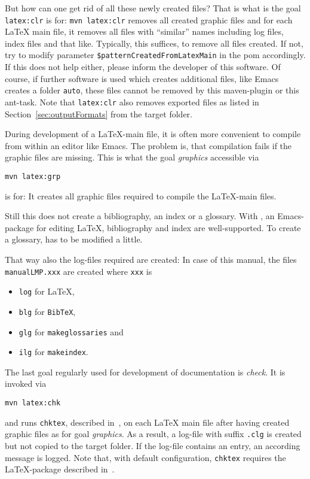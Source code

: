 But how can one get rid of all these newly created files? 
That is what is the goal \texttt{latex:clr} is for: 
% 
\texttt{mvn latex:clr}
%
removes all created graphic files 
and for each \LaTeX{} main file, it removes all files with ``similar'' names
including log files, index files and that like.
Typically, this suffices, to remove all files created. 
If not, 
try to modify parameter \texttt{\$patternCreatedFromLatexMain} 
in the pom accordingly. 
If this does not help either, please inform the developer of this software. 
Of course, if further software is used which creates additional files, 
like Emacs creates a folder \texttt{auto}, 
these files cannot be removed by this maven-plugin or this ant-task.
Note that \texttt{latex:clr}
also removes exported files as listed in Section~\ref{sec:outputFormats}
from the target folder. 

During development of a \LaTeX-main file, 
it is often more convenient to compile from within an editor like Emacs. 
The problem is, that compilation fails if the graphic files are missing. 
This is what the goal \emph{graphics} accessible via 
% 
\begin{Verbatim}
mvn latex:grp
\end{Verbatim}
%
is for: 
It creates all graphic files required to compile the \LaTeX-main files. 

Still this does not create a bibliography, an index or a glossary. 
With \auctex{}, an Emacs-package for editing \LaTeX, 
bibliography and index are well-supported. 
To create a glossary, \auctex{} has to be modified a little. 


That way also the log-files required are created: 
In case of this manual, 
the files \texttt{manualLMP.xxx} are created 
where \texttt{xxx} is 
%
\begin{itemize}
\item
\texttt{log} for \LaTeX, 
\item
\texttt{blg} for \texttt{BibTeX}, 
\item
\texttt{glg} for \texttt{makeglossaries} and 
\item
\texttt{ilg} for \texttt{makeindex}. 
\end{itemize}

The last goal regularly used for development of documentation is \emph{check}. 
It is invoked via 
% 
\begin{Verbatim}
mvn latex:chk
\end{Verbatim}
%
and runs \texttt{chktex}, described in~\cite{ChkTeX22}, 
on each \LaTeX{} main file 
after having created graphic files as for goal \emph{graphics}. 
As a result, a log-file with suffix \texttt{.clg} is created 
but not copied to the target folder. 
If the log-file contains an entry, 
an according message is logged. 
Note that, with default configuration, 
\texttt{chktex} requires the \LaTeX-package  
described in~\cite{BooktP}. 

